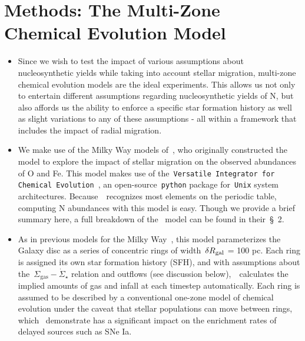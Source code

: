 \documentclass[ms.tex]{subfiles}
\begin{document}
 

\section{Methods: The Multi-Zone Chemical Evolution Model} 
\label{sec:methods} 

\begin{itemize} 
	\item Since we wish to test the impact of various assumptions about 
	nucleosynthetic yields while taking into account stellar migration, 
	multi-zone chemical evolution models are the ideal experiments. 
	This allows us not only to entertain different assumptions regarding 
	nucleosynthetic yields of N, but also affords us the ability to enforce a 
	specific star formation history as well as slight variations to any of 
	these assumptions - all within a framework that includes the impact of 
	radial migration. 

	\item We make use of the Milky Way models of~\citet{Johnson2021}, who 
	originally constructed the model to explore the impact of stellar migration 
	on the observed abundances of O and Fe. 
	This model makes use of the~\texttt{Versatile Integrator for Chemical 
	Evolution}~\citep[\vice;][]{Johnson2020, Griffith2021, Johnson2021}, an 
	open-source~\texttt{python} package for~\texttt{Unix} system architectures. 
	Because~\vice~recognizes most elements on the periodic table, computing 
	N abundances with this model is easy. 
	Though we provide a brief summary here, a full breakdown of 
	the~\citet{Johnson2021} model can be found in their~\S~2. 

	\item As in previous models for the Milky Way~\citep[e.g.][]{Matteucci1989, 
	Schoenrich2009, Minchev2013, Minchev2014, Minchev2017, Sharma2020}, this 
	model parameterizes the Galaxy disc as a series of concentric rings of 
	width~$\delta R_\text{gal}$ = 100 pc.
	Each ring is assigned its own star formation history (SFH), and with 
	assumptions about the~$\Sigma_\text{gas}-\dot{\Sigma}_\star$ relation and 
	outflows (see discussion below),~\vice~calculates the implied amounts of 
	gas and infall at each timestep automatically. 
	Each ring is assumed to be described by a conventional one-zone model of 
	chemical evolution under the caveat that stellar populations can move 
	between rings, which~\citet{Johnson2021} demonstrate has a significant 
	impact on the enrichment rates of delayed sources such as SNe Ia. 


\end{itemize}
\end{document}
